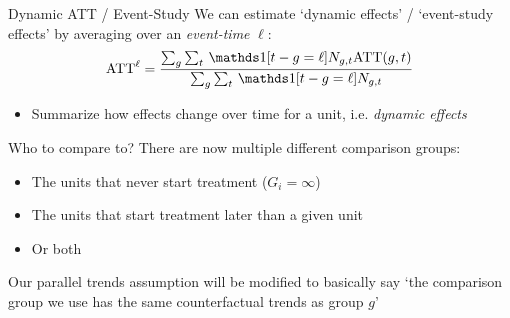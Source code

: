 \documentclass[aspectratio=169,t,11pt,table]{beamer}
\begin{document}
\begin{frame}{Dynamic ATT / Event-Study}
  We can estimate `dynamic effects' / `event-study effects' by averaging over an \emph{event-time} $\ell$:
  $$
    \text{ATT}^\ell =
    \frac{\sum_{g} \sum_{t} \one{t - g = \ell} N_{g,t} \text{ATT}(g,t)}
    {\sum_{g} \sum_{t} \one{t - g = \ell} N_{g,t}}
  $$

  \bigskip
  \begin{itemize}
    \item Summarize how effects change over time for a unit, i.e. \emph{dynamic effects}
  \end{itemize}
\end{frame}

\begin{frame}{Who to compare to?}
  There are now multiple different comparison groups:
  \begin{itemize}
    \item The units that never start treatment ($G_i = \infty$)
    
    \item The units that start treatment later than a given unit
    
    \item Or both
  \end{itemize}

  \bigskip
  Our parallel trends assumption will be modified to basically say `the comparison group we use has the same counterfactual trends as group $g$'
\end{frame}
\end{document}
